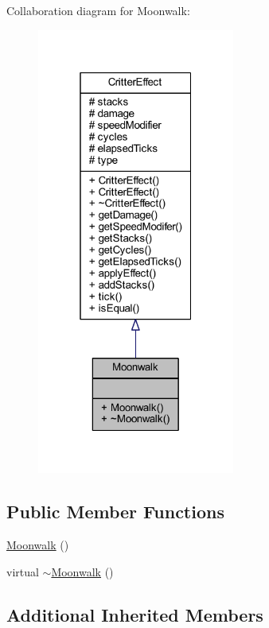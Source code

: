 Collaboration diagram for Moonwalk\+:
\nopagebreak
\begin{figure}[H]
\begin{center}
\leavevmode
\includegraphics[width=184pt]{struct_moonwalk__coll__graph}
\end{center}
\end{figure}
\subsection*{Public Member Functions}
\begin{DoxyCompactItemize}
\item 
\hyperlink{struct_moonwalk_a20553c4bda79a628e8cfe34440814c98}{Moonwalk} ()
\item 
virtual \hyperlink{struct_moonwalk_a1300a2298ea2da2bce19f83fe2b2381c}{$\sim$\+Moonwalk} ()
\end{DoxyCompactItemize}
\subsection*{Additional Inherited Members}


